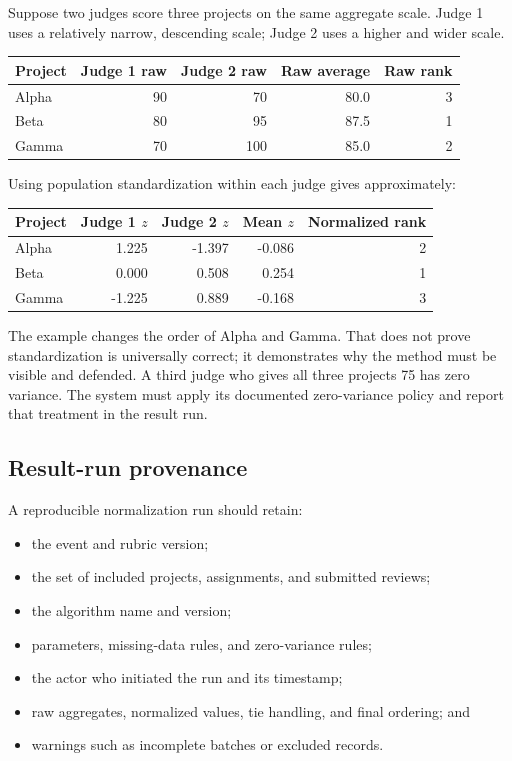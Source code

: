 \documentclass[11pt]{article}
\begin{document}
Suppose two judges score three projects on the same aggregate scale. Judge 1 uses a relatively narrow, descending scale; Judge 2 uses a higher and wider scale.

\begin{center}
\begin{tabular}{@{}lrrrr@{}}
\toprule
\textbf{Project} & \textbf{Judge 1 raw} & \textbf{Judge 2 raw} & \textbf{Raw average} & \textbf{Raw rank}\\
\midrule
Alpha & 90 & 70 & 80.0 & 3\\
Beta  & 80 & 95 & 87.5 & 1\\
Gamma & 70 & 100 & 85.0 & 2\\
\bottomrule
\end{tabular}
\end{center}

Using population standardization within each judge gives approximately:

\begin{center}
\begin{tabular}{@{}lrrrr@{}}
\toprule
\textbf{Project} & \textbf{Judge 1 $z$} & \textbf{Judge 2 $z$} & \textbf{Mean $z$} & \textbf{Normalized rank}\\
\midrule
Alpha & 1.225 & -1.397 & -0.086 & 2\\
Beta  & 0.000 &  0.508 &  0.254 & 1\\
Gamma & -1.225 & 0.889 & -0.168 & 3\\
\bottomrule
\end{tabular}
\end{center}

The example changes the order of Alpha and Gamma. That does not prove standardization is universally correct; it demonstrates why the method must be visible and defended. A third judge who gives all three projects 75 has zero variance. The system must apply its documented zero-variance policy and report that treatment in the result run.

\subsection{Result-run provenance}

A reproducible normalization run should retain:

\begin{itemize}
  \item the event and rubric version;
  \item the set of included projects, assignments, and submitted reviews;
  \item the algorithm name and version;
  \item parameters, missing-data rules, and zero-variance rules;
  \item the actor who initiated the run and its timestamp;
  \item raw aggregates, normalized values, tie handling, and final ordering; and
  \item warnings such as incomplete batches or excluded records.
\end{itemize}
\end{document}
